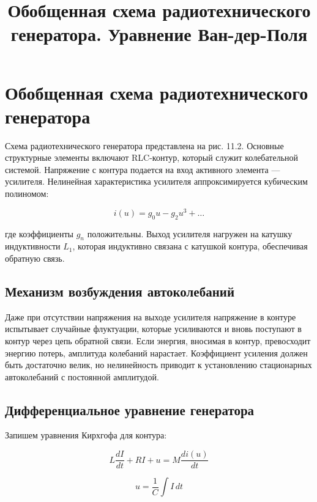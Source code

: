 \documentclass[a4paper,12pt]{article}
\title{Обобщенная схема радиотехнического генератора. Уравнение Ван-дер-Поля}
\author{}
\date{}
\begin{document}
\maketitle

\section{Обобщенная схема радиотехнического генератора}

Схема радиотехнического генератора представлена на рис. 11.2. Основные структурные элементы включают RLC-контур, который служит колебательной системой. Напряжение с контура подается на вход активного элемента — усилителя. Нелинейная характеристика усилителя аппроксимируется кубическим полиномом:

\begin{equation}
i(u) = g_0 u - g_2 u^3 + \ldots
\end{equation}

где коэффициенты $g_n$ положительны. Выход усилителя нагружен на катушку индуктивности $L_1$, которая индуктивно связана с катушкой контура, обеспечивая обратную связь.


\subsection{Механизм возбуждения автоколебаний}

Даже при отсутствии напряжения на выходе усилителя напряжение в контуре испытывает случайные флуктуации, которые усиливаются и вновь поступают в контур через цепь обратной связи. Если энергия, вносимая в контур, превосходит энергию потерь, амплитуда колебаний нарастает. Коэффициент усиления должен быть достаточно велик, но нелинейность приводит к установлению стационарных автоколебаний с постоянной амплитудой.

\subsection{Дифференциальное уравнение генератора}

Запишем уравнения Кирхгофа для контура:

\begin{equation}
L \frac{dI}{dt} + RI + u = M \frac{di(u)}{dt}
\end{equation}

\begin{equation}
u = \frac{1}{C} \int I \, dt
\end{equation}
\end{document}
